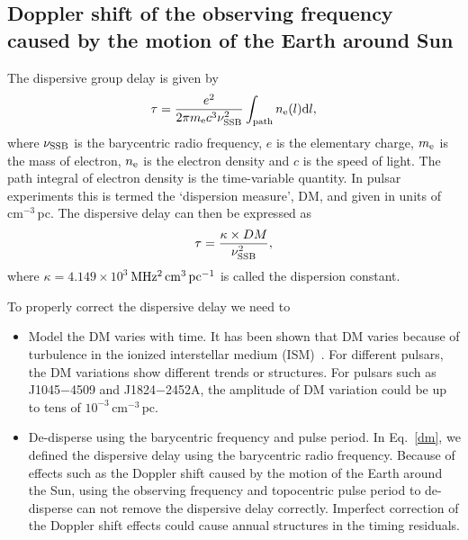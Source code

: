 \documentclass[useAMS,usenatbib]{mn2e}
\begin{document}


\onecolumn
\newpage

\begin{appendix}

\section{Doppler shift of the observing frequency caused by the motion of the Earth around Sun}

The dispersive group delay is given by
\begin{equation}
\label{dm}
\tau=\frac{e^2}{2\pi m_{\rm{e}}c^3\nu_{\rm{SSB}}^2}\int_{\rm{path}}n_{\rm{e}}(l){\rm{d}}l,
\end{equation}
where $\nu_{\rm{SSB}}$ is the barycentric radio frequency, $e$ is the elementary charge, $m_{\rm{e}}$ is 
the mass of electron, $n_{\rm{e}}$ is the electron density and $c$ is the speed of light. 
The path integral of electron density is the time-variable quantity. In pulsar experiments 
this is termed the `dispersion measure', DM, and given in units of cm$^{-3}$\,pc. 
%
The dispersive delay can then be expressed as
%
\begin{equation}
\tau=\frac{\kappa\times DM}{\nu_{\rm{SSB}}^{2}},
\end{equation}
%
where $\kappa=4.149\times 10^{3}$\,$\rm{MHz^{2}\,cm^{3}\,pc^{-1}}$ is called the dispersion constant.
%

To properly correct the dispersive delay we need to 
\begin{itemize}
\item Model the DM varies with time. It has been shown that DM varies because of turbulence 
in the ionized interstellar medium (ISM)~\citep{Keith13,You07}. For different pulsars, 
the DM variations show different trends or structures. For pulsars such as 
J1045$-$4509 and J1824$-$2452A, the amplitude of DM variation could be up to tens of 
$10^{-3}$\,cm$^{-3}$\,pc.
\item De-disperse using the barycentric frequency and pulse period. In Eq.~\ref{dm}, we 
defined the dispersive delay using the barycentric radio frequency. Because of effects such 
as the Doppler shift caused by the motion of the Earth around the Sun, using the observing 
frequency and topocentric pulse period to de-disperse can not remove the dispersive delay 
correctly. Imperfect correction of the Doppler shift effects could cause annual structures 
in the timing residuals.
\end{itemize}


\end{appendix}
\end{document}
